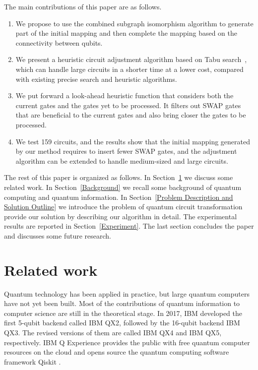 \documentclass[runningheads]{llncs}
\begin{document}
The main contributions of this paper are as follows.
	\begin{enumerate}
	\item We propose to use the combined subgraph isomorphism algorithm to generate part of the initial mapping
    and then complete the mapping based on the connectivity between qubits.
	\item We present a heuristic circuit adjustment algorithm based on Tabu search~\cite{Glover1990}, which can handle large circuits in a shorter time at a lower cost, compared with existing precise search and heuristic algorithms.
	\item  We put forward a look-ahead heuristic function that considers both the current gates and the  gates yet to be processed. It filters out SWAP gates that are beneficial to the current gates and also bring closer the gates to be processed.
	\item We test 159 circuits, and the results show that the initial mapping generated by our method requires to insert fewer SWAP gates, and the adjustment algorithm can be extended to handle medium-sized and large circuits.
	\end{enumerate}

The rest of this paper is organized as follows.
In Section~\ref{Related work} we discuss some related work. 
In Section~\ref{Background} we recall some background of quantum computing and quantum information. In Section~\ref{Problem Description and Solution Outline}
we introduce the problem of  quantum circuit transformation provide our solution by describing our algorithm in detail.
The experimental results are reported in Section~\ref{Experiment}. 
The last section concludes the paper and discusses some future research.

\section{Related work}
\label{Related work}
Quantum technology has been applied in practice, but large quantum computers have not yet been built. Most of the contributions of quantum information to computer science are still in the theoretical stage. In 2017, IBM developed the first 5-qubit backend called IBM QX2, followed by the 16-qubit backend  IBM QX3. The revised versions of them are called IBM QX4 and IBM QX5, respectively. IBM Q Experience \cite{ibm} provides the public with free quantum computer resources on the cloud and opens source the quantum computing software framework Qiskit \cite{qiskit}. 
\end{document}
